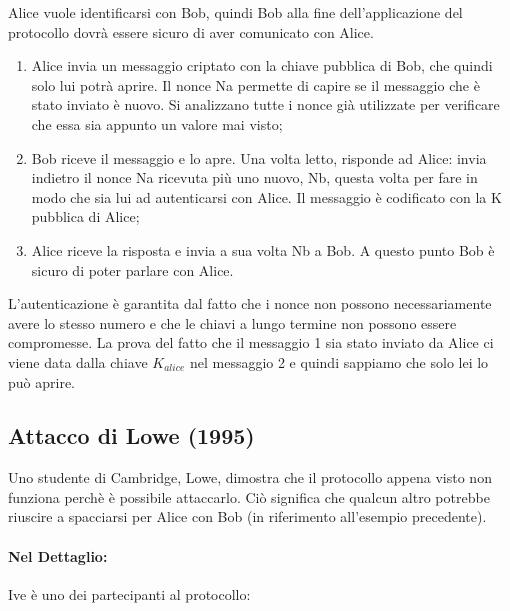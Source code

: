 Alice vuole identificarsi con Bob, quindi Bob alla fine dell’applicazione del protocollo dovrà essere
sicuro di aver comunicato con Alice.
\begin{enumerate}
    \item Alice invia un messaggio criptato con la
          chiave pubblica di Bob, che quindi solo lui potrà
          aprire. Il nonce Na permette di capire se il
          messaggio che è stato inviato è nuovo. Si
          analizzano tutte i nonce già utilizzate per
          verificare che essa sia appunto un valore mai
          visto;
    \item Bob riceve il messaggio e lo apre. Una volta
          letto, risponde ad Alice: invia indietro il nonce
          Na ricevuta più uno nuovo, Nb, questa volta
          per fare in modo che sia lui ad autenticarsi con
          Alice. Il messaggio è codificato con la K
          pubblica di Alice;
    \item Alice riceve la risposta e invia a sua volta
          Nb a Bob. A questo punto Bob è sicuro di poter
          parlare con Alice.
\end{enumerate}

L’autenticazione è garantita dal fatto che i nonce non
possono necessariamente avere lo stesso
numero e che le chiavi a lungo termine non possono
essere compromesse.
La prova del fatto che il messaggio 1 sia stato inviato
da Alice ci viene data dalla chiave \(K_{alice}\) nel
messaggio 2 e quindi sappiamo che solo lei lo può aprire.

\subsection{Attacco di Lowe (1995)}

Uno studente di Cambridge, Lowe, dimostra che il protocollo appena visto non funziona perchè è
possibile attaccarlo. Ciò significa che qualcun altro potrebbe riuscire a spacciarsi per Alice con Bob
(in riferimento all’esempio precedente).

\paragraph{Nel Dettaglio: }
Ive è uno dei partecipanti al protocollo:

